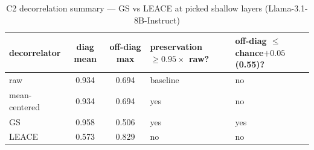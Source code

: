 \begin{table}[t]
\centering
\caption{C2 decorrelation summary — GS vs LEACE at picked shallow layers (Llama-3.1-8B-Instruct)}
\label{tab:c2_purity_summary}
\begin{tabular}{lccll}
\toprule
decorrelator & diag mean & off-diag max & preservation $\geq 0.95\times$ raw? & off-diag $\leq$ chance$+0.05$ (0.55)? \\
\midrule
raw & 0.934 & 0.694 & baseline & no \\
mean-centered & 0.934 & 0.694 & yes & no \\
GS & 0.958 & 0.506 & yes & yes \\
LEACE & 0.573 & 0.829 & no & no \\
\bottomrule
\end{tabular}
\end{table}
